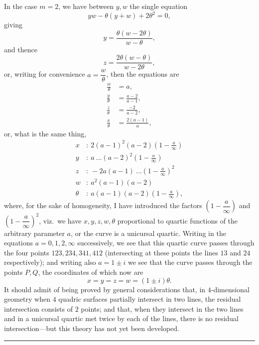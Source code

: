 \documentclass[11pt]{article}
\begin{document}
\medskip
In the case $m=2$, we have between $y,w$ the single equation
\[
yw-\theta(y+w)+2\theta^{2}=0,
\]
giving
\[
y=\frac{\theta(w-2\theta)}{w-\theta},
\]
and thence
\[
z=\frac{2\theta(w-\theta)}{w-2\theta},
\]
or, writing for convenience $a=\dfrac{w}{\theta}$, then the equations are
\begin{align*}
\frac{w}{\theta} &= a,\\
\frac{y}{\theta} &= \frac{a-2}{a-1},\\
\frac{z}{\theta} &= \frac{-2}{a-2},\\
\frac{x}{\theta} &= \frac{2(a-1)}{a},
\end{align*}
or, what is the same thing,
\begin{align*}
x &:\ 2(a-1)^{2}(a-2)\!\left(1-\tfrac{a}{\infty}\right)\\
y &:\ a\ \ldots(a-2)^{2}\!\left(1-\tfrac{a}{\infty}\right)\\
z &:\ -2a(a-1)\ \ldots\!\left(1-\tfrac{a}{\infty}\right)^{2}\\
w &:\ a^{2}(a-1)(a-2)\\
\theta &:\ a(a-1)(a-2)\!\left(1-\tfrac{a}{\infty}\right),
\end{align*}
where, for the sake of homogeneity, I have introduced the factors $\!\left(1-\dfrac{a}{\infty}\right)$
and $\!\left(1-\dfrac{a}{\infty}\right)^{2}$, viz.\ we have $x,y,z,w,\theta$ proportional to
quartic functions of the arbitrary parameter $a$, or the curve is a unicursal quartic.
Writing in the equations $a=0,1,2,\infty$ successively, we see that this quartic curve
passes through the four points $123,234,341,412$ (intersecting at these points the lines
$13$ and $24$ respectively); and writing also $a=1\pm i$ we see that the curve passes
through the points $P,Q$, the coordinates of which now are
\[
x=y=z=w=(1\pm i)\theta.
\]
It should admit of being proved by general considerations that, in $4$-dimensional
geometry when $4$ quadric surfaces partially intersect in two lines, the residual
intersection consists of $2$ points; and that, when they intersect in the two lines
and in a unicursal quartic met twice by each of the lines, there is no residual
intersection---but this theory has not yet been developed.

\bigskip
\hrule
\bigskip

\end{document}

